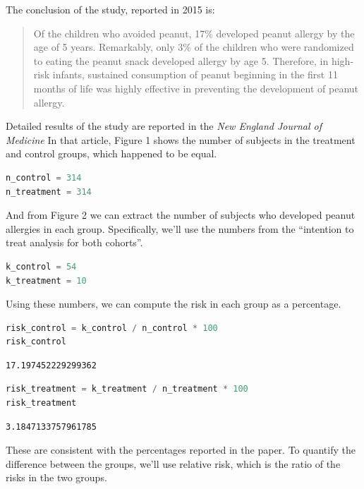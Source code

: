 The conclusion of the study, reported in 2015 is:

\begin{quote}
Of the children who avoided peanut, 17\% developed peanut allergy by the
age of 5 years. Remarkably, only 3\% of the children who were randomized
to eating the peanut snack developed allergy by age 5. Therefore, in
high-risk infants, sustained consumption of peanut beginning in the
first 11 months of life was highly effective in preventing the
development of peanut allergy.
\end{quote}

Detailed results of the study are reported in the \emph{New England
Journal of Medicine} In that article, Figure 1 shows the number of
subjects in the treatment and control groups, which happened to be
equal.

\begin{lstlisting}[language=Python,style=source]
n_control = 314
n_treatment = 314
\end{lstlisting}

And from Figure 2 we can extract the number of subjects who developed
peanut allergies in each group. Specifically, we'll use the numbers from
the ``intention to treat analysis for both cohorts''.

\begin{lstlisting}[language=Python,style=source]
k_control = 54
k_treatment = 10
\end{lstlisting}

Using these numbers, we can compute the risk in each group as a
percentage.

\begin{lstlisting}[language=Python,style=source]
risk_control = k_control / n_control * 100
risk_control
\end{lstlisting}

\begin{lstlisting}[style=output]
17.197452229299362
\end{lstlisting}

\begin{lstlisting}[language=Python,style=source]
risk_treatment = k_treatment / n_treatment * 100
risk_treatment
\end{lstlisting}

\begin{lstlisting}[style=output]
3.1847133757961785
\end{lstlisting}

These are consistent with the percentages reported in the paper. To
quantify the difference between the groups, we'll use relative risk,
which is the ratio of the risks in the two groups.

